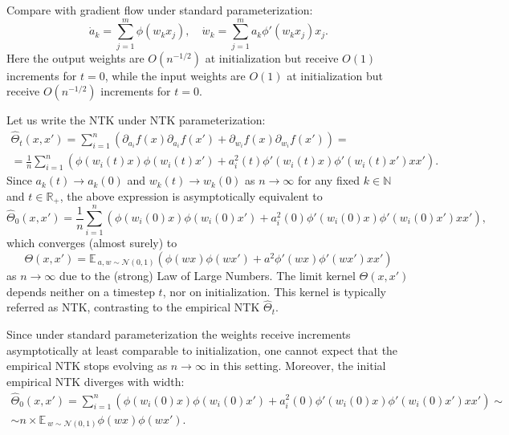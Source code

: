 \documentclass{article}
\newcommand{\EE}{\mathbb{E}\,}
\newcommand{\RR}{\mathbb{R}}
\newcommand{\NN}{\mathcal{N}}
\begin{document}
    Compare with gradient flow under standard parameterization:
    \begin{equation}
        \dot a_k 
        = \sum_{j=1}^m \phi(w_k x_j),
        \quad
        \dot w_k 
        = \sum_{j=1}^m a_k \phi'(w_k x_j) x_j.
    \end{equation}
    Here the output weights are $O(n^{-1/2})$ at initialization but receive $O(1)$ increments for $t=0$, while the input weights are $O(1)$ at initialization but receive $O(n^{-1/2})$ increments for $t=0$.

    Let us write the NTK under NTK parameterization:
    \begin{multline}
        \hat\Theta_t(x,x')
        = \sum_{i=1}^n \left(\partial_{a_i} f(x) \partial_{a_i} f(x') + \partial_{w_i} f(x) \partial_{w_i} f(x')\right)
        =\\= \frac{1}{n} \sum_{i=1}^n \left(\phi(w_i(t) x) \phi(w_i(t) x') + a_i^2(t) \phi'(w_i(t) x) \phi'(w_i(t) x') x x'\right).
    \end{multline}
    Since $a_k(t) \to a_k(0)$ and $w_k(t) \to w_k(0)$ as $n \to \infty$ for any fixed $k \in \mathbb{N}$ and $t \in \RR_+$, the above expression is asymptotically equivalent to
    \begin{equation}
        \hat\Theta_0(x,x')
        = \frac{1}{n} \sum_{i=1}^n \left(\phi(w_i(0) x) \phi(w_i(0) x') + a_i^2(0) \phi'(w_i(0) x) \phi'(w_i(0) x') x x'\right),
    \end{equation}
    which converges (almost surely) to
    \begin{equation}
        \Theta(x,x')
        = \EE_{a,w \sim \NN(0,1)} \left(\phi(w x) \phi(w x') + a^2 \phi'(w x) \phi'(w x') x x'\right)
    \end{equation}
    as $n \to \infty$ due to the (strong) Law of Large Numbers.
    The limit kernel $\Theta(x,x')$ depends neither on a timestep $t$, nor on initialization.
    This kernel is typically referred as NTK, contrasting to the empirical NTK $\hat\Theta_t$.

    Since under standard parameterization the weights receive increments asymptotically at least comparable to initialization, one cannot expect that the empirical NTK stops evolving as $n \to \infty$ in this setting.
    Moreover, the initial empirical NTK diverges with width:
    \begin{multline}
        \hat\Theta_0(x,x')
        = \sum_{i=1}^n \left(\phi(w_i(0) x) \phi(w_i(0) x') + a_i^2(0) \phi'(w_i(0) x) \phi'(w_i(0) x') x x'\right)
        \sim\\\sim n \times \EE_{w \sim \NN(0,1)} \phi(w x) \phi(w x').
    \end{multline}
\end{document}
